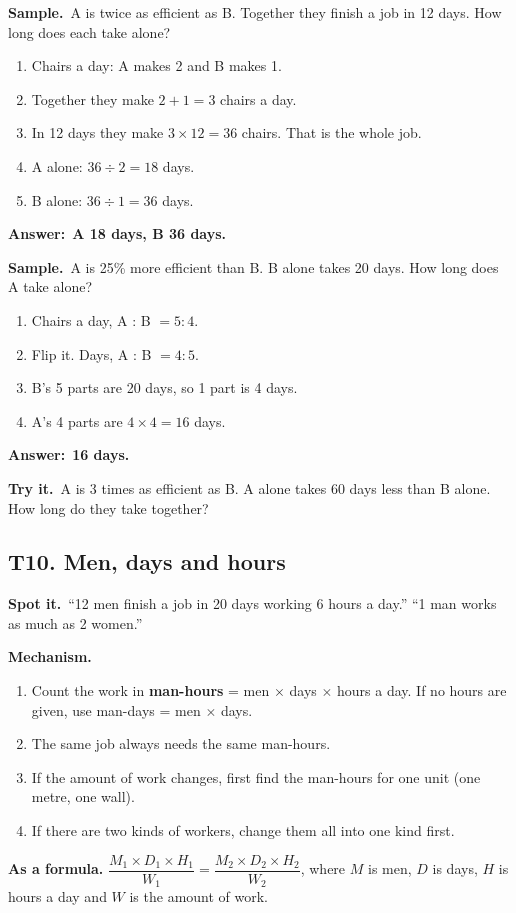 \documentclass[11pt,a4paper]{article}
\let\oldsubsection\subsection
\renewcommand{\subsection}{\needspace{9\baselineskip}\oldsubsection}
\newcommand{\spot}{\textbf{\color{ember}Spot it.}\ }
\newcommand{\mech}{\textbf{\color{ember}Mechanism.}\ }
\newif\ifkeepsamp
\newcommand{\ans}[1]{\par\nopagebreak\noindent\textbf{\color{ember}Answer:}\ \textbf{#1}\par}
\newcommand{\samp}{\ifkeepsamp\needspace{4\baselineskip}\fi\textbf{\color{ember}Sample.}\ }
\newcommand{\tryit}[1]{\textbf{\color{ember}Try it.}\ #1}
\begin{document}
\samp A is twice as efficient as B. Together they finish a job in 12 days. How long does each take alone?
\begin{enumerate}
\item Chairs a day: A makes 2 and B makes 1.
\item Together they make $2 + 1 = 3$ chairs a day.
\item In 12 days they make $3 \times 12 = 36$ chairs. That is the whole job.
\item A alone: $36 \div 2 = 18$ days.
\item B alone: $36 \div 1 = 36$ days.
\end{enumerate}
\ans{A 18 days, B 36 days.}

\samp A is 25\% more efficient than B. B alone takes 20 days. How long does A take alone?
\begin{enumerate}
\item Chairs a day, A : B $= 5 : 4$.
\item Flip it. Days, A : B $= 4 : 5$.
\item B's 5 parts are 20 days, so 1 part is 4 days.
\item A's 4 parts are $4 \times 4 = 16$ days.
\end{enumerate}
\ans{16 days.}

\tryit A is 3 times as efficient as B. A alone takes 60 days less than B alone. How long do they take together?

\subsection{T10. Men, days and hours}
\spot ``12 men finish a job in 20 days working 6 hours a day.'' ``1 man works as much as 2 women.''

\mech
\begin{enumerate}
\item Count the work in \textbf{man-hours} = men $\times$ days $\times$ hours a day. If no hours are given, use man-days = men $\times$ days.
\item The same job always needs the same man-hours.
\item If the amount of work changes, first find the man-hours for one unit (one metre, one wall).
\item If there are two kinds of workers, change them all into one kind first.
\end{enumerate}
\textbf{As a formula.} $\dfrac{M_1 \times D_1 \times H_1}{W_1}=\dfrac{M_2 \times D_2 \times H_2}{W_2}$, where $M$ is men, $D$ is days, $H$ is hours a day and $W$ is the amount of work.
\end{document}
